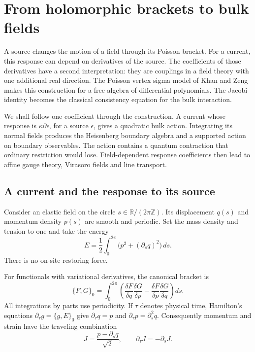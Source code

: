\chapter{From holomorphic brackets to bulk fields}
\label{rc:poisson-sigma}
\label{pcsm:chapter}
\label{pcsm:section}

A source changes the motion of a field through its Poisson bracket.
For a current, this response can depend on derivatives of the source.
The coefficients of those derivatives have a second interpretation:
they are couplings in a field theory with one additional real direction.
The Poisson vertex sigma model of Khan and Zeng~\cite{pcsm:KZ}
makes this construction for a free algebra of differential polynomials.
The Jacobi identity becomes the classical consistency equation for the
bulk interaction.

We shall follow one coefficient through the construction.
A current whose response is \(\kappa\partial\epsilon\), for a source
\(\epsilon\), gives a quadratic bulk action.
Integrating its normal fields produces the Heisenberg boundary algebra
and a supported action on boundary observables.
The action contains a quantum contraction that ordinary restriction
would lose.
Field-dependent response coefficients then lead to affine gauge theory,
Virasoro fields and line transport.

\section{A current and the response to its source}
\label{pcsm:sec:source-response}

Consider an elastic field on the circle
\(s\in\mathbb R/(2\pi\mathbb Z)\).
Its displacement \(q(s)\) and momentum density \(p(s)\) are smooth
and periodic. Set the mass density and tension to one and take the energy
\[
 E=\frac12\int_0^{2\pi}\bigl(p^2+(\partial_s q)^2\bigr)\,ds.
\]
There is no on-site restoring force.

For functionals with variational derivatives, the canonical bracket is
\[
 \{F,G\}_0=\int_0^{2\pi}
 \left(\frac{\delta F}{\delta q}\frac{\delta G}{\delta p}
       -\frac{\delta F}{\delta p}\frac{\delta G}{\delta q}\right)ds.
\]
All integrations by parts use periodicity.
If\label{pcsm:def:physical-time} \(\tau\) denotes physical time, Hamilton's equations
\(\partial_\tau g=\{g,E\}_0\) give
\(\partial_\tau q=p\) and \(\partial_\tau p=\partial_s^2q\).
Consequently momentum and strain have the traveling combination
\begin{equation}\label{pcsm:eq:elastic-current}
 J=\frac{p-\partial_s q}{\sqrt2},\qquad
 \partial_\tau J=-\partial_sJ.
\end{equation}

